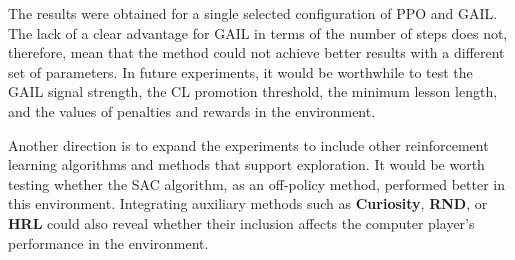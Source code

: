 The results were obtained for a single selected configuration of PPO and GAIL. The lack of a clear advantage for GAIL in terms of the number of steps does not, therefore, mean that the method could not achieve better results with a different set of parameters. In future experiments, it would be worthwhile to test the GAIL signal strength, the CL promotion threshold, the minimum lesson length, and the values of penalties and rewards in the environment.

Another direction is to expand the experiments to include other reinforcement learning algorithms and methods that support exploration. It would be worth testing whether the SAC algorithm, as an off-policy method, performed better in this environment. Integrating auxiliary methods such as \textbf{Curiosity}, \textbf{RND}, or \textbf{HRL} could also reveal whether their inclusion affects the computer player’s performance in the environment.

